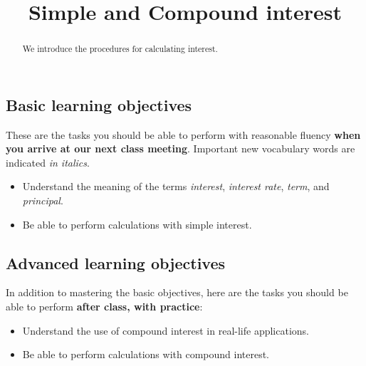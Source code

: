 \documentclass{ximera}
\title{Simple and Compound interest}
\begin{document}
\begin{abstract}
We introduce the procedures for calculating interest.
\end{abstract}
\maketitle

\subsection*{Basic learning objectives}

These are the tasks you should be able to perform with reasonable fluency \textbf{when you arrive at our next class meeting}. Important new vocabulary words are indicated \emph{in italics}. 

\begin{itemize}
	\item Understand the meaning of the terms \emph{interest}, \emph{interest rate}, \emph{term}, and \emph{principal}.
    \item Be able to perform calculations with simple interest.
\end{itemize}

\subsection*{Advanced learning objectives}

In addition to mastering the basic objectives, here are the tasks you should be able to perform \textbf{after class, with practice}: 

\begin{itemize}
	\item Understand the use of compound interest in real-life applications.
	\item Be able to perform calculations with compound interest.
\end{itemize}
\end{document}
